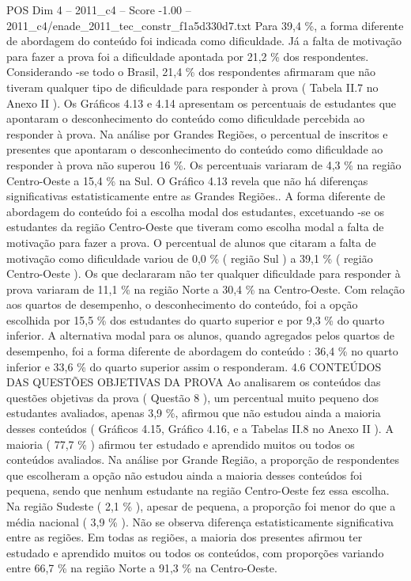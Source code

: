 \begin{textsample}{POS Dim 4 – 2011\_c4 – Score -1.00 – 2011\_c4/enade\_2011\_tec\_constr\_f1a5d330d7.txt}
Para 39,4 \%, a forma diferente de abordagem do conteúdo foi indicada como dificuldade.
Já a falta de motivação para fazer a prova foi a dificuldade apontada por 21,2 \% dos respondentes.
Considerando -se todo o Brasil, 21,4 \% dos respondentes afirmaram que não tiveram qualquer tipo de dificuldade para responder à prova ( Tabela II.7 no Anexo II ).
Os Gráficos 4.13 e 4.14 apresentam os percentuais de estudantes que apontaram o desconhecimento do conteúdo como dificuldade percebida ao responder à prova.
Na análise por Grandes Regiões, o percentual de inscritos e presentes que apontaram o desconhecimento do conteúdo como dificuldade ao responder à prova não superou 16 \%.
Os percentuais variaram de 4,3 \% na região Centro-Oeste a 15,4 \% na Sul.
O Gráfico 4.13 revela que não há diferenças significativas estatisticamente entre as Grandes Regiões..
A forma diferente de abordagem do conteúdo foi a escolha modal dos estudantes, excetuando -se os estudantes da região Centro-Oeste que tiveram como escolha modal a falta de motivação para fazer a prova.
O percentual de alunos que citaram a falta de motivação como dificuldade variou de 0,0 \% ( região Sul ) a 39,1 \% ( região Centro-Oeste ).
Os que declararam não ter qualquer dificuldade para responder à prova variaram de 11,1 \% na região Norte a 30,4 \% na Centro-Oeste.
Com relação aos quartos de desempenho, o desconhecimento do conteúdo, foi a opção escolhida por 15,5 \% dos estudantes do quarto superior e por 9,3 \% do quarto inferior.
A alternativa modal para os alunos, quando agregados pelos quartos de desempenho, foi a forma diferente de abordagem do conteúdo : 36,4 \% no quarto inferior e 33,6 \% do quarto superior assim o responderam. 4.6 CONTEÚDOS DAS QUESTÕES OBJETIVAS DA PROVA Ao analisarem os conteúdos das questões objetivas da prova ( Questão 8 ), um percentual muito pequeno dos estudantes avaliados, apenas 3,9 \%, afirmou que não estudou ainda a maioria desses conteúdos ( Gráficos 4.15, Gráfico 4.16, e a Tabelas II.8 no Anexo II ).
A maioria ( 77,7 \% ) afirmou ter estudado e aprendido muitos ou todos os conteúdos avaliados.
Na análise por Grande Região, a proporção de respondentes que escolheram a opção não estudou ainda a maioria desses conteúdos foi pequena, sendo que nenhum estudante na região Centro-Oeste fez essa escolha.
Na região Sudeste ( 2,1 \% ), apesar de pequena, a proporção foi menor do que a média nacional ( 3,9 \% ).
Não se observa diferença estatisticamente significativa entre as regiões.
Em todas as regiões, a maioria dos presentes afirmou ter estudado e aprendido muitos ou todos os conteúdos, com proporções variando entre 66,7 \% na região Norte a 91,3 \% na Centro-Oeste.

\end{textsample}
